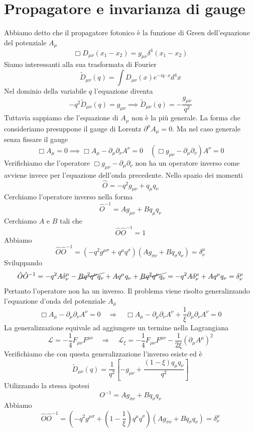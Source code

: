 \section{Propagatore e invarianza di gauge}
Abbiamo detto che il propagatore fotonico è la funzione di Green dell'equazione del potenziale $A_\mu$
$$
\Box D_{\mu\nu}(x_1 - x_2) = g_{\mu\nu} \delta^4(x_1 - x_2)
$$
Siamo interessanti alla sua trasformata di Fourier
$$
\tilde{D}_{\mu\nu}(q) = \int D_{\mu\nu}(x) e^{-iq \cdot x} d^4x
$$
Nel dominio della variabile $q$ l'equazione diventa
$$
-q^2 \tilde{D}_{\mu\nu}(q) = g_{\mu\nu} \implies \tilde{D}_{\mu\nu}(q) = -\frac{g_{\mu\nu}}{q^2}
$$
Tuttavia sappiamo che l'equazione di $A_\mu$ non è la più generale. La forma che consideriamo presuppone il gauge di Lorentz $\partial^\mu A_\mu=0$. Ma nel caso generale senza fissare il gauge
$$
\Box A_\mu = 0 \implies \Box A_\mu - \partial_\mu \partial_\nu A^\nu = 0 \quad (\Box g_{\mu\nu} - \partial_\mu \partial_\nu) A^\nu = 0
$$
Verifichiamo che l'operatore $\Box g_{\mu\nu}-\partial_\mu\partial_\nu$ non ha un operatore inverso come avviene invece per l'equazione dell'onda precedente. Nello spazio dei momenti
$$
\hat{O} = -q^2 g_{\mu\nu} + q_\mu q_\nu
$$
Cerchiamo l'operatore inverso nella forma
$$
\hat{O}^{-1} = A g_{\mu\nu} + B q_\mu q_\nu
$$
Cerchiamo $A$ e $B$ tali che 
$$
\hat{O} \hat{O}^{-1} = 1
$$
Abbiamo
$$
\hat{O} \hat{O}^{-1} = (-q^2 g^{\mu\sigma} + q^\mu q^\sigma) (A g_{\sigma\nu} + B q_\sigma q_\nu) = \delta^\mu_\nu
$$
Sviluppando
$$
\hat{O} \hat{O}^{-1} = -q^2 A \delta^\mu_\nu - \cancel{B q^2 q^\mu q_\nu} + A q^\mu q_\nu + \cancel{B q^2 q^\mu q_\nu} = -q^2 A \delta^\mu_\nu + A q^\mu q_\nu = \delta^\mu_\nu
$$
Pertanto l'operatore non ha un inverso. Il problema viene risolto generalizzando l'equazione d'onda del potenziale $A_\mu$
$$
\Box A_\mu - \partial_\mu \partial_\nu A^\nu = 0 \quad \Longrightarrow \quad \Box A_\mu - \partial_\mu \partial_\nu A^\nu + \frac{1}{\xi} \partial_\mu \partial_\nu A^\nu = 0
$$
La generalizzazione equivale ad aggiungere un termine nella Lagrangiana
$$
\mathcal{L} = -\frac{1}{4} F_{\mu\nu} F^{\mu\nu} \quad \Longrightarrow \quad \mathcal{L}_\xi = -\frac{1}{4} F_{\mu\nu} F^{\mu\nu} - \frac{1}{2\xi}(\partial_\mu A^\mu)^2
$$
Verifichiamo che con questa generalizzazione l'inverso esiste ed è
$$
\tilde{D}_{\mu\nu}(q) = \frac{1}{q^2} \left[ -g_{\mu\nu} + \frac{(1 - \xi) q_\mu q_\nu}{q^2} \right]
$$
Utilizzando la stessa ipotesi
$$
O^{-1} = A g_{\sigma\nu} + B q_\sigma q_\nu
$$
Abbiamo
$$
\hat{O} \hat{O}^{-1} = \left( -q^2 g^{\mu\sigma} + (1 - \frac{1}{\xi}) q^\mu q^\sigma \right) (A g_{\sigma\nu} + B q_\sigma q_\nu) = \delta^\mu_\nu
$$
